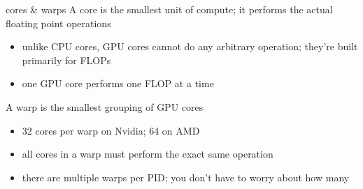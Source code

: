 \documentclass[aspectratio=169]{beamer}
\begin{document}
\begin{frame}{cores \& warps}
\vspace{-0.5in}
A core is the smallest unit of compute; it performs the actual floating point operations
\begin{itemize}
    \item unlike CPU cores, GPU cores cannot do any arbitrary operation; they're built primarily for FLOPs
    \item one GPU core performs one FLOP at a time
\end{itemize}
A warp is the smallest grouping of GPU cores
\begin{itemize}
    \item 32 cores per warp on Nvidia; 64 on AMD
    \item all cores in a warp must perform the exact same operation
    \item there are multiple warps per PID; you don't have to worry about how many
\end{itemize}
\end{frame}
\end{document}
